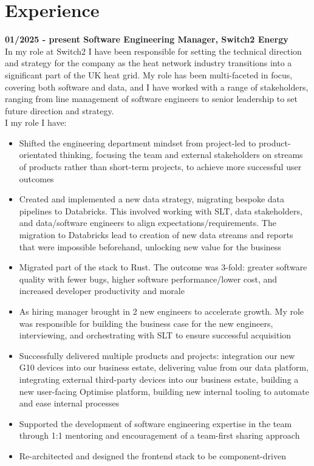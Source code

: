 \section{Experience}

\textbf{01/2025 - present \hspace{2.75em}Software Engineering Manager, Switch2 Energy}\\

In my role at Switch2 I have been responsible for setting the technical direction and strategy for the company as the heat network industry transitions into a significant part of the UK heat grid. My role has been multi-faceted in focus, covering both software and data, and I have worked with a range of stakeholders, ranging from line management of software engineers to senior leadership to set future direction and strategy.\\

I my role I have:\\

\begin{itemize}
  \item Shifted the engineering department mindset from project-led to product-orientated thinking, focusing the team and external stakeholders on streams of products rather than short-term projects, to achieve more successful user outcomes
  \item Created and implemented a new data strategy, migrating bespoke data pipelines to Databricks. This involved working with SLT, data stakeholders, and data/software engineers to align expectations/requirements. The migration to Databricks lead to creation of new data streams and reports that were impossible beforehand, unlocking new value for the business
  \item Migrated part of the stack to Rust. The outcome was 3-fold: greater software quality with fewer bugs, higher software performance/lower cost, and increased developer productivity and morale
  \item As hiring manager brought in 2 new engineers to accelerate growth. My role was responsible for building the business case for the new engineers, interviewing, and orchestrating with SLT to ensure successful acquisition
  \item Successfully delivered multiple products and projects: integration our new G10 devices into our business estate, delivering value from our data platform, integrating external third-party devices into our business estate, building a new user-facing Optimise platform, building new internal tooling to automate and ease internal processes
  \item Supported the development of software engineering expertise in the team through 1:1 mentoring and encouragement of a team-first sharing approach
  \item Re-architected and designed the frontend stack to be component-driven
\end{itemize}

